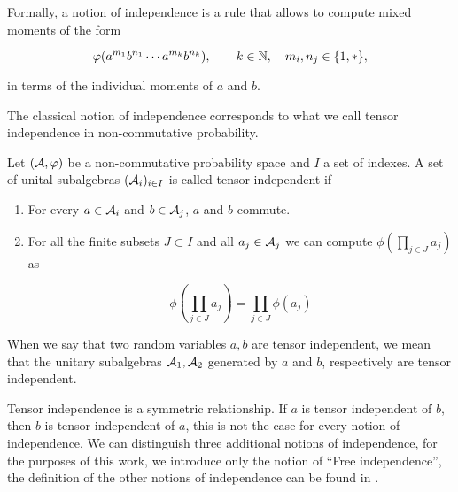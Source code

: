     Formally, a notion of independence is a rule that allows to compute mixed moments of the form

    \begin{equation*}
        \varphi(a^{m_1}b^{n_1} \cdots a^{m_{k}}b^{n_k}), \qquad k \in \mathbb N, \quad m_i, n_j \in \{1,*\},
    \end{equation*}

    \noindent in terms of the individual moments of $a$ and $b$.

    The classical notion of independence corresponds to what we call tensor independence in non-commutative probability.

    \begin{definition}
        Let $(\mathcal A, \varphi)$ be a non-commutative probability space and $I$ a set of indexes. A set of unital subalgebras $(\mathcal A_{i})_{i\in I}$ is called tensor independent if

        \begin{enumerate}
            \item For every $a\in \mathcal A_i$ and $b\in \mathcal A_j$, $a$ and $b$ commute.
            \item For all the finite subsets $J\subset I$ and all $a_j \in \mathcal A_j$ we can compute $\phi\left( \prod_{j\in J} a_j \right)$ as
            
            \begin{equation*}
                \phi\left( \prod_{j\in J} a_j \right) = \prod_{j\in J}  \phi\left( a_j \right)
            \end{equation*}
        \end{enumerate}

        When we say that two random variables $a,b$ are tensor independent, we mean that the unitary subalgebras $\mathcal A_1, \mathcal A_2$ generated by $a$ and $b$, respectively are tensor independent.
    \end{definition}

    Tensor independence is a symmetric relationship. If $a$ is tensor independent of $b$, then $b$ is tensor independent of $a$, this is not the case for every notion of independence. We can distinguish three additional notions of independence, for the purposes of this work, we introduce only the notion of ``Free independence'', the definition of the other notions of independence can be found in \cite{anaya2016cumulantes}.


